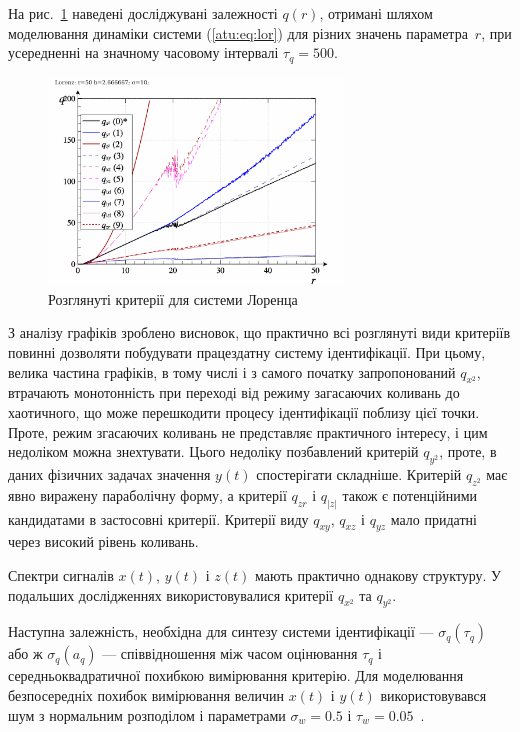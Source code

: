 На рис.~\ref{atu:f:lor_q} наведені досліджувані залежності
$q(r)$, отримані шляхом моделювання динаміки системи (\ref{atu:eq:lor})
для різних значень параметра~$r$, при усередненні на значному часовому інтервалі
$\tau_q = 500 $.


\begin{figure}[htb!]
  \begin{center}
    \includegraphics[width=0.7\textwidth]{p/cha/lor/lor_q-p_q_r.png}
  \end{center}
  \caption{Розглянуті критерії для системи Лоренца}
  \label{atu:f:lor_q}
\end{figure}

З аналізу графіків зроблено висновок, що практично всі розглянуті види
критеріїв повинні дозволяти побудувати працездатну систему ідентифікації. При
цьому, велика частина графіків, в тому числі і з самого початку запропонований
$q_{x^2}$, втрачають монотонність при переході від режиму загасаючих
коливань до хаотичного,
що може перешкодити процесу ідентифікації поблизу цієї
точки. Проте, режим згасаючих коливань не представляє
практичного інтересу, і цим недоліком можна знехтувати. Цього
недоліку позбавлений критерій
$q_{y^2}$, проте, в даних фізичних задачах значення
$y(t)$ спостерігати складніше. Критерій
$q_{z^2}$ має явно виражену параболічну форму, а критерії
$q_{zr}$ і
$q_{|z|}$ також є потенційними кандидатами в застосовні
критерії. Критерії виду
$q_{xy}$,
$q_{xz}$ і
$q_{yz}$ мало придатні через високий рівень коливань.

Спектри сигналів $x(t)$, $y(t)$ і $z(t)$ мають практично однакову
структуру. У подальших дослідженнях використовувалися критерії
$q_{x^2}$ та
$q_{y^2}$.

Наступна залежність, необхідна для синтезу системи
ідентифікації ---
$\sigma_q(\tau_q)$\label{atu:d:sigma_q} або ж
$\sigma_q(a_q)$ --- співвідношення між часом оцінювання
$\tau_q$ і середньоквадратичної похибкою вимірювання критерію. Для
моделювання безпосередніх похибок вимірювання величин
$x(t)$ і
$y(t)$ використовувався шум з нормальним розподілом і
параметрами
$\sigma_w = 0.5$ і
$\tau_w = 0.05$~\cite{atu_asau26}.

